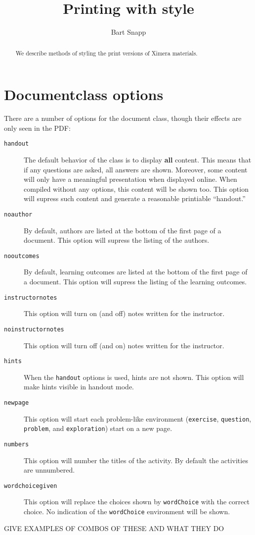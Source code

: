 \documentclass{ximera}
\title{Printing with style}
\author{Bart Snapp}
\begin{document}
\begin{abstract}
We describe methods of styling the print versions of Ximera materials.
\end{abstract}
\maketitle
 


\section{Documentclass options}

There are a number of options for the document class, though their
effects are only seen in the PDF:
 
\begin{description}
\item[\texttt{handout}] The default behavior of the class is to display \textbf{all} content. This means that if any questions are asked, all answers are shown. Moreover, some content will only have a meaningful presentation when displayed online. When compiled without any options, this content will be shown too. This option will supress such content and generate a reasonable printiable ``handout.''
\item[\texttt{noauthor}] By default, authors are listed at the bottom of the first page of a document. This option will supress the listing of the authors.
\item[\texttt{nooutcomes}] By default, learning outcomes are listed at the bottom of the first page of a document. This option will supress the listing of the learning outcomes.
\item[\texttt{instructornotes}] This option will turn on (and off) notes written for the instructor.
\item[\texttt{noinstructornotes}] This option will turn off (and on) notes written for the instructor.
\item[\texttt{hints}] When the \texttt{handout} options is used, hints are not shown. This option will make hints visible in handout mode.
\item[\texttt{newpage}] This option will start each problem-like environment (\texttt{exercise}, \texttt{question}, \texttt{problem}, and \texttt{exploration}) start on a new page.
\item[\texttt{numbers}] This option will number the titles of the activity. By default the activities are unnumbered.
\item[\texttt{wordchoicegiven}] This option will replace the choices shown by \texttt{wordChoice} with the correct choice. No indication of the \texttt{wordChoice} environment will be shown.
\end{description}


GIVE EXAMPLES OF COMBOS OF THESE AND WHAT THEY DO
\end{document}
